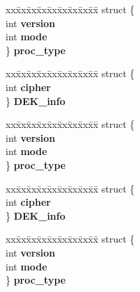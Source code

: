 \begin{DoxyCompactItemize}
\begin{tabbing}
\end{tabbing}\item 
\mbox{\label{structpem__ctx__st_ac43cda3248dcc26c5dc20a42de5eb8f1}} 
\begin{tabbing}
xx\=xx\=xx\=xx\=xx\=xx\=xx\=xx\=xx\=\kill
struct \{\\
\>int {\bfseries version}\\
\>int {\bfseries mode}\\
\} {\bfseries proc\_type}\\

\end{tabbing}\item 
\mbox{\label{structpem__ctx__st_a437973065c81f31dbd96e27bbca16d66}} 
\begin{tabbing}
xx\=xx\=xx\=xx\=xx\=xx\=xx\=xx\=xx\=\kill
struct \{\\
\>int {\bfseries cipher}\\
\} {\bfseries DEK\_info}\\

\end{tabbing}\item 
\mbox{\label{structpem__ctx__st_a0162454d7616d81afffa44a560c89d17}} 
\begin{tabbing}
xx\=xx\=xx\=xx\=xx\=xx\=xx\=xx\=xx\=\kill
struct \{\\
\>int {\bfseries version}\\
\>int {\bfseries mode}\\
\} {\bfseries proc\_type}\\

\end{tabbing}\item 
\mbox{\label{structpem__ctx__st_ad551eda42b4e1410806fe596be9a1ce9}} 
\begin{tabbing}
xx\=xx\=xx\=xx\=xx\=xx\=xx\=xx\=xx\=\kill
struct \{\\
\>int {\bfseries cipher}\\
\} {\bfseries DEK\_info}\\

\end{tabbing}\item 
\mbox{\label{structpem__ctx__st_ab625329612386f2e66bdf9a91a7ee31b}} 
\begin{tabbing}
xx\=xx\=xx\=xx\=xx\=xx\=xx\=xx\=xx\=\kill
struct \{\\
\>int {\bfseries version}\\
\>int {\bfseries mode}\\
\} {\bfseries proc\_type}\\


\end{tabbing}
\end{DoxyCompactItemize}
